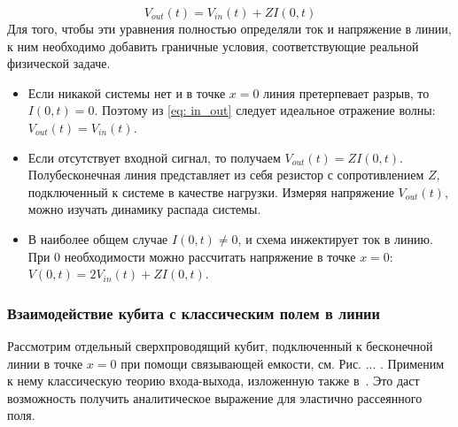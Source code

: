 \begin{equation}
V_{out}(t) = V_{in}(t) + ZI(0,t)
\label{eq: in_out}
\end{equation}
 Для того, чтобы эти уравнения полностью определяли ток и напряжение в линии, к ним необходимо добавить граничные условия, соответствующие реальной физической задаче.
\begin{itemize}
	\item  Если никакой системы нет и в точке $x=0$ линия претерпевает разрыв, то $I(0,t)=0$. Поэтому из \eqref{eq: in_out} следует идеальное отражение волны: $V_{out}(t) = V_{in}(t)$.
	\item Если отсутствует входной сигнал, то получаем $V_{out}(t) = ZI(0,t)$. Полубесконечная линия представляет из себя резистор с сопротивлением $Z$, подключенный к системе в качестве нагрузки. Измеряя напряжение $V_{out}(t)$, можно изучать динамику распада системы.
	\item В наиболее общем случае $I(0,t)\ne 0$, и схема инжектирует ток в линию. При 
	0
	необходимости можно рассчитать напряжение в точке $x=0$: $V(0,t) = 2V_{in}(t) + ZI(0,t)$.  	
\end{itemize}
\subsubsection{Взаимодействие кубита с классическим полем в линии}
Рассмотрим отдельный сверхпроводящий кубит, подключенный к бесконечной линии в точке $x=0$ при помощи связывающей емкости, см. Рис. ... . Применим к нему классическую теорию входа-выхода, изложенную также в~\cite{zagoskin2011quantum}. Это даст возможность получить аналитическое выражение для эластично рассеянного поля. 

